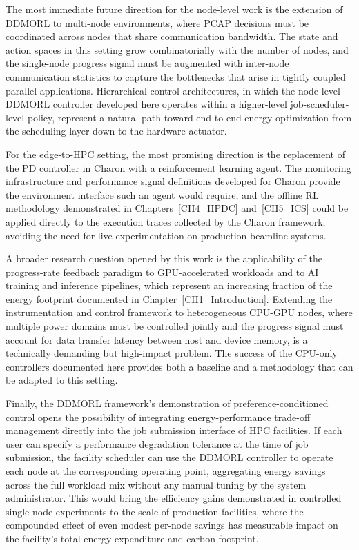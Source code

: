 The most immediate future direction for the node-level work is the extension of DDMORL
to multi-node environments, where PCAP decisions must be coordinated across nodes that
share communication bandwidth.
The state and action spaces in this setting grow combinatorially with the number of
nodes, and the single-node progress signal must be augmented with inter-node
communication statistics to capture the bottlenecks that arise in tightly coupled
parallel applications.
Hierarchical control architectures, in which the node-level DDMORL controller developed
here operates within a higher-level job-scheduler-level policy, represent a natural
path toward end-to-end energy optimization from the scheduling layer down to the
hardware actuator.

For the edge-to-HPC setting, the most promising direction is the replacement of the
PD controller in Charon with a reinforcement learning agent.
The monitoring infrastructure and performance signal definitions developed for Charon
provide the environment interface such an agent would require, and the offline RL
methodology demonstrated in Chapters~\ref{CH4_HPDC} and~\ref{CH5_ICS} could be
applied directly to the execution traces collected by the Charon framework, avoiding
the need for live experimentation on production beamline systems.

A broader research question opened by this work is the applicability of the progress-rate
feedback paradigm to GPU-accelerated workloads and to AI training and inference
pipelines, which represent an increasing fraction of the energy footprint documented in
Chapter~\ref{CH1_Introduction}.
Extending the instrumentation and control framework to heterogeneous CPU-GPU nodes,
where multiple power domains must be controlled jointly and the progress signal must
account for data transfer latency between host and device memory, is a technically
demanding but high-impact problem.
The success of the CPU-only controllers documented here provides both a baseline and a
methodology that can be adapted to this setting.

Finally, the DDMORL framework's demonstration of preference-conditioned control opens
the possibility of integrating energy-performance trade-off management directly into
the job submission interface of HPC facilities.
If each user can specify a performance degradation tolerance at the time of job
submission, the facility scheduler can use the DDMORL controller to operate each node
at the corresponding operating point, aggregating energy savings across the full
workload mix without any manual tuning by the system administrator.
This would bring the efficiency gains demonstrated in controlled single-node experiments
to the scale of production facilities, where the compounded effect of even modest
per-node savings has measurable impact on the facility's total energy expenditure and
carbon footprint.

